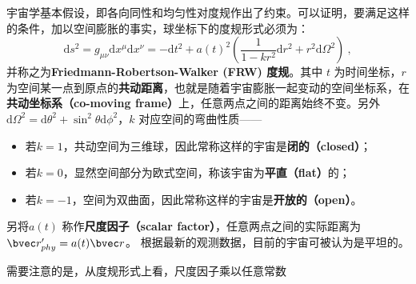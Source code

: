 
宇宙学基本假设，即各向同性和均匀性对度规作出了约束。可以证明，要满足这样的条件，加以空间膨胀的事实，球坐标下的度规形式必须为：
\begin{equation}
\mathrm{d}s^2=g_{\mu\nu}\mathrm{d}x^{\mu}\mathrm{d}x^{\nu}=-\mathrm{d}t^2+a(t)^2 \left( \frac{1}{1-kr^2}\mathrm{d}r^2+r^2 \mathrm{d} \Omega^2\right)~,
\end{equation}
并称之为\textbf{Friedmann-Robertson-Walker (FRW) 度规}。其中 $t$ 为时间坐标，$r$ 为空间某一点到原点的\textbf{共动距离}，也就是随着宇宙膨胀一起变动的空间坐标系，在\textbf{共动坐标系（co-moving frame）}上，任意两点之间的距离始终不变。另外$\mathrm{d} \Omega^2 =\mathrm{d} \theta^2 + \sin^2\theta\mathrm{d} \phi^2 $，$k$ 对应空间的弯曲性质——
\begin{itemize}
\item 若$k=1$，共动空间为三维球，因此常称这样的宇宙是\textbf{闭的（closed）}；
\item 若$k=0$，显然空间部分为欧式空间，称该宇宙为\textbf{平直（flat）}的；
\item 若$k=-1$，空间为双曲面，因此常称这样的宇宙是\textbf{开放的（open）}。
\end{itemize}
 另将$a(t)$ 称作\textbf{尺度因子（scalar factor）}，任意两点之间的实际距离为$\bvec r'_{phy}=a(t)\bvec r$。
根据最新的观测数据，目前的宇宙可被认为是平坦的。

需要注意的是，从度规形式上看，尺度因子乘以任意常数

